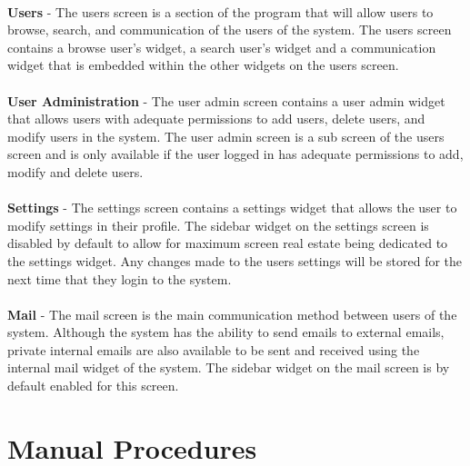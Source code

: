 \documentclass[letterpaper,12pt]{report}
\begin{document}
\paragraph*{}\hspace{0.6cm}\textbf{Users} - The users screen is a section of the program that will allow users to browse, search, and communication of the users of the system. The users screen contains a browse user’s widget, a search user’s widget and a communication widget that is embedded within the other widgets on the users screen.

\paragraph*{}\hspace{0.6cm}\textbf{User Administration} - The user admin screen contains a user admin widget that allows users with adequate permissions to add users, delete users, and modify users in the system. The user admin screen is a sub screen of the users screen and is only available if the user logged in has adequate permissions to add, modify and delete users.

\paragraph*{}\hspace{0.6cm}\textbf{Settings} - The settings screen contains a settings widget that allows the user to modify settings in their profile. The sidebar widget on the settings screen is disabled by default to allow for maximum screen real estate being dedicated to the settings widget. Any changes made to the users settings will be stored for the next time that they login to the system.

\paragraph*{}\hspace{0.6cm}\textbf{Mail} - The mail screen is the main communication method between users of the system. Although the system has the ability to send emails to external emails, private internal emails are also available to be sent and received using the internal mail widget of the system. The sidebar widget on the mail screen is by default enabled for this screen.
\pagebreak
\section{Manual Procedures}
\end{document}
